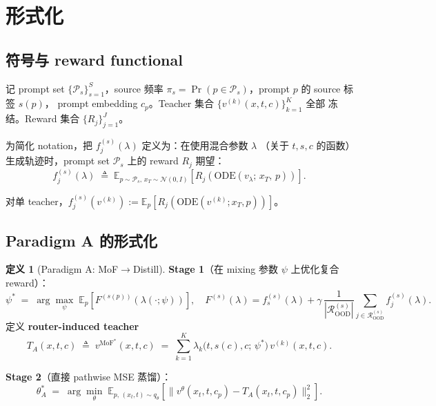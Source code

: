 \documentclass[11pt,a4paper]{article}
\newcommand{\E}{\mathbb{E}}
\newcommand{\N}{\mathcal{N}}
\newcommand{\MoF}{\mathrm{MoF}}
\newcommand{\OOD}{\mathrm{OOD}}
\newcommand{\ODE}{\mathrm{ODE}}
\theoremstyle{definition}
\newtheorem{definition}{定义}
\begin{document}
\section{形式化}
\label{sec:formalize}

\subsection{符号与 reward functional}

记 prompt set $\{\mathcal{P}_s\}_{s=1}^S$，source 频率
$\pi_s = \Pr(p \in \mathcal{P}_s)$，prompt $p$ 的 source 标签 $s(p)$，
prompt embedding $c_p$。Teacher 集合 $\{v^{(k)}(x, t, c)\}_{k=1}^K$ 全部
冻结。Reward 集合 $\{R_j\}_{j=1}^J$。

为简化 notation，把 $f_j^{(s)}(\lambda)$ 定义为：在使用混合参数 $\lambda$
（关于 $t, s, c$ 的函数）生成轨迹时，prompt set $\mathcal{P}_s$ 上的
reward $R_j$ 期望：
\begin{equation}
f_j^{(s)}(\lambda) \;\triangleq\; \E_{p \sim \mathcal{P}_s,\,x_T \sim \N(0, I)}\!\left[R_j\!\left(\ODE\!\left(v_\lambda;\,x_T,\,p\right)\right)\right].
\label{eq:f_def}
\end{equation}

对单 teacher，$f_j^{(s)}(v^{(k)}) := \E_p[R_j(\ODE(v^{(k)}; x_T, p))]$。

\subsection{Paradigm A 的形式化}

\begin{definition}[Paradigm A: MoF$\to$Distill]
\label{def:paradigm_A}
\textbf{Stage 1}（在 mixing 参数 $\psi$ 上优化复合 reward）：
\begin{equation}
\psi^* \;=\; \arg\max_\psi\;\E_{p}\!\left[F^{(s(p))}\!\left(\lambda(\cdot;\psi)\right)\right],\quad
F^{(s)}(\lambda) = f_s^{(s)}(\lambda) + \gamma\,\frac{1}{|\mathcal{R}_{\OOD}^{(s)}|}\sum_{j \in \mathcal{R}_{\OOD}^{(s)}} f_j^{(s)}(\lambda).
\label{eq:stage1_obj}
\end{equation}
定义 \textbf{router-induced teacher}
\begin{equation}
T_A(x, t, c) \;\triangleq\; v^{\MoF^*}(x, t, c) \;=\; \sum_{k=1}^K \lambda_k\!\big(t, s(c), c;\,\psi^*\big)\,v^{(k)}(x, t, c).
\label{eq:T_A_def}
\end{equation}

\textbf{Stage 2}（直接 pathwise MSE 蒸馏）：
\begin{equation}
\theta_A^* \;=\; \arg\min_\theta\;\E_{p,\,(x_t, t) \sim q_\theta}\!\left[\big\|v^\theta(x_t, t, c_p) - T_A(x_t, t, c_p)\big\|_2^2\right].
\label{eq:stage2_obj}
\end{equation}
\end{definition}
\end{document}
